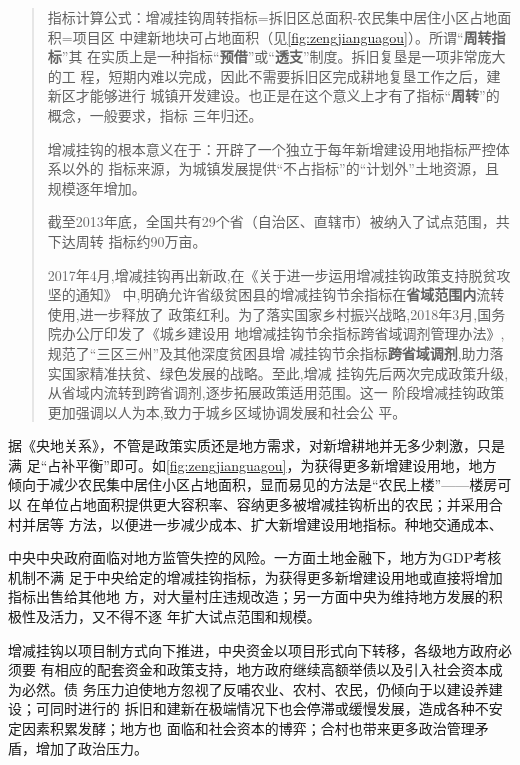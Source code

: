 \begin{quotation}
  指标计算公式：增减挂钩周转指标=拆旧区总面积-农民集中居住小区占地面积=项目区
  中建新地块可占地面积（见\cref{fig:zengjianguagou}）。所谓“\textbf{周转指标}”其
  在实质上是一种指标“\textbf{预借}”或“\textbf{透支}”制度。拆旧复垦是一项非常庞大的工
  程，短期内难以完成，因此不需要拆旧区完成耕地复垦工作之后，建新区才能够进行
  城镇开发建设。也正是在这个意义上才有了指标“\textbf{周转}”的概念，一般要求，指标
  三年归还。

  增减挂钩的根本意义在于：开辟了一个独立于每年新增建设用地指标严控体系以外的
  指标来源，为城镇发展提供“不占指标”的“计划外”土地资源，且规模逐年增加。\cite{yangdi}


  截至2013年底，全国共有29个省（自治区、直辖市）被纳入了试点范围，共下达周转
  指标约90万亩。

  2017年4月,增减挂钩再出新政,在《关于进一步运用增减挂钩政策支持脱贫攻坚的通知》
  中,明确允许省级贫困县的增减挂钩节余指标在\textbf{省域范围内}流转使用,进一步释放了
  政策红利。为了落实国家乡村振兴战略,2018年3月,国务院办公厅印发了《城乡建设用
  地增减挂钩节余指标跨省域调剂管理办法》,规范了“三区三州”及其他深度贫困县增
  减挂钩节余指标\textbf{跨省域调剂},助力落实国家精准扶贫、绿色发展的战略。至此,增减
  挂钩先后两次完成政策升级,从省域内流转到跨省调剂,逐步拓展政策适用范围。这一
  阶段增减挂钩政策更加强调以人为本,致力于城乡区域协调发展和社会公
  平。\cite{zengjianzongshu}
\end{quotation}

据《央地关系》，不管是政策实质还是地方需求，对新增耕地并无多少刺激，只是满
足“占补平衡”即可。如\cref{fig:zengjianguagou}，为获得更多新增建设用地，地方
倾向于减少农民集中居住小区占地面积，显而易见的方法是“农民上楼”——楼房可以
在单位占地面积提供更大容积率、容纳更多被增减挂钩析出的农民；并采用合村并居等
方法，以便进一步减少成本、扩大新增建设用地指标。种地交通成本、

中央中央政府面临对地方监管失控的风险。一方面土地金融下，地方为GDP考核机制不满
足于中央给定的增减挂钩指标，为获得更多新增建设用地或直接将增加指标出售给其他地
方，对大量村庄违规改造；另一方面中央为维持地方发展的积极性及活力，又不得不逐
年扩大试点范围和规模。

增减挂钩以项目制方式向下推进，中央资金以项目形式向下转移，各级地方政府必须要
有相应的配套资金和政策支持，地方政府继续高额举债以及引入社会资本成为必然。债
务压力迫使地方忽视了反哺农业、农村、农民，仍倾向于以建设养建设；可同时进行的
拆旧和建新在极端情况下也会停滞或缓慢发展，造成各种不安定因素积累发酵；地方也
面临和社会资本的博弈；合村也带来更多政治管理矛盾，增加了政治压力。

